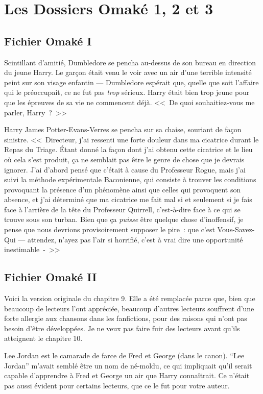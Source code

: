 \chapter{Les Dossiers Omaké 1, 2 et 3}

\section{Fichier Omaké I}

Scintillant d'amitié, Dumbledore se pencha au-dessus de son bureau en direction du jeune Harry. Le garçon était venu le voir avec un air d'une terrible intensité peint sur son visage enfantin — Dumbledore espérait que, quelle que soit l'affaire qui le préoccupait, ce ne fut pas \emph{trop} sérieux. Harry était bien trop jeune pour que les épreuves de sa vie ne commencent déjà. <<~De quoi souhaitiez-vous me parler, Harry~?~>>

Harry James Potter-Evans-Verres se pencha sur sa chaise, souriant de façon sinistre. <<~Directeur, j'ai ressenti une forte douleur dans ma cicatrice durant le Repas du Triage. Étant donné la façon dont j'ai obtenu cette cicatrice et le lieu où cela s'est produit, ça ne semblait pas être le genre de chose que je devrais ignorer. J'ai d'abord pensé que c'était à cause du Professeur Rogue, mais j'ai suivi la méthode expérimentale Baconienne, qui consiste à trouver les conditions provoquant la présence d'un phénomène ainsi que celles qui provoquent son absence, et j'ai déterminé que ma cicatrice me fait mal si et seulement si je fais face à l'arrière de la tête du Professeur Quirrell, c'est-à-dire face à ce qui se trouve sous son turban. Bien que ça \emph{puisse} être quelque chose d'inoffensif, je pense que nous devrions provisoirement supposer le pire~: que c'est Vous-Savez-Qui — attendez, n'ayez pas l'air si horrifié, c'est à vrai dire une opportunité inestimable~-~>>

\section{Fichier Omaké II}

Voici la version originale du chapitre 9. Elle a été remplacée parce que, bien que beaucoup de lecteurs l'ont appréciée, beaucoup d'autres lecteurs souffrent d'une forte allergie aux chansons dans les fanfictions, pour des raisons qui n'ont pas besoin d'être développées. Je ne veux pas faire fuir des lecteurs avant qu'ils atteignent le chapitre 10.

Lee Jordan est le camarade de farce de Fred et George (dans le canon). “Lee Jordan” m'avait semblé être un nom de né-moldu, ce qui impliquait qu'il serait capable d'apprendre à Fred et George un air que Harry connaîtrait. Ce n'était pas aussi évident pour certains lecteurs, que ce le fut pour votre auteur.

